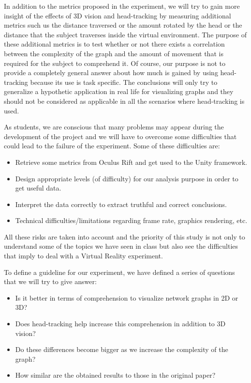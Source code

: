 In addition to the metrics proposed in the experiment, we will try to
gain more insight of the effects of 3D vision and head-tracking by
measuring additional metrics such us the distance traversed or the
amount rotated by the head or the distance that the subject traverses
inside the virtual environment. The purpose of these additional metrics
is to test whether or not there exists a correlation between the
complexity of the graph and the amount of movement that is required for
the subject to comprehend it. Of course, our purpose is not to provide a
completely general answer about how much is gained by using
head-tracking because its use is task specific. The conclusions will
only try to generalize a hypothetic application in real life for
visualizing graphs and they should not be considered as applicable in
all the scenarios where head-tracking is used.

As students, we are conscious that many problems may appear during the
development of the project and we will have to overcome some
difficulties that could lead to the failure of the experiment. Some of
these difficulties are:

\begin{itemize}
\item
  Retrieve some metrics from Oculus Rift and get used to the Unity
  framework.
\item
  Design appropriate levels (of difficulty) for our analysis purpose in
  order to get useful data.
\item
  Interpret the data correctly to extract truthful and correct
  conclusions.
\item
  Technical difficulties/limitations regarding frame rate, graphics
  rendering, etc.
\end{itemize}

All these risks are taken into account and the priority of this study is
not only to understand some of the topics we have seen in class but also
see the difficulties that imply to deal with a Virtual Reality
experiment.

To define a guideline for our experiment, we have defined a series of
questions that we will try to give answer:

\begin{itemize}
\item
  Is it better in terms of comprehension to visualize network graphs in
  2D or 3D?
\item
  Does head-tracking help increase this comprehension in addition to 3D
  vision?
\item
  Do these differences become bigger as we increase the complexity of
  the graph?
\item
  How similar are the obtained results to those in the original paper?
\end{itemize}

